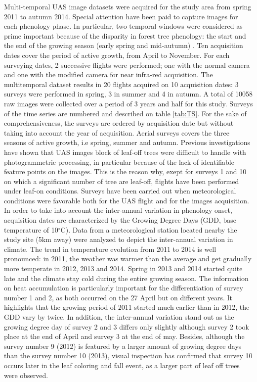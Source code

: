 \documentclass[remotesensing,article,submit,moreauthors,pdftex,12pt,a4paper]{mdpi} %
\begin{document}
Multi-temporal UAS image datasets were acquired for the study area from spring 2011 to autumn 2014. 
Special attention have been paid to capture images for each phenology phase. 
In particular, two temporal windows were considered as prime important because of the disparity in forest tree phenology: the start and the end of the growing season (early spring and mid-autumn) \cite{hill_mapping_2010, key_comparison_2001}. 
Ten acquisition dates cover the period of active growth, from April to November. 
For each surveying dates, 2 successive flights were performed; one with the normal camera and one with the modified camera for near infra-red acquisition. The multitemporal dataset results in 20 flights acquired on 10 acquisition dates: 3 surveys were performed in spring, 3 in summer and 4 in autumn. 
A total of 10058 raw images were collected over a period of 3 years and half for this study. 
Surveys of the time series are numbered and described on table \ref{tab:TS}.
For the sake of comprehensiveness, the surveys are ordered by acquisition date but without taking into account the year of acquisition. 
Aerial surveys covers the three seasons of active growth, i.e spring, summer and autumn. Previous investigations have shown that UAS images block of leaf-off trees were difficult to handle with photogrammetric processing, in particular because of the lack of identifiable feature points on the images. 
This is the reason why, exept for surveys 1 and 10 on which a significant number of tree are leaf-off, flights have been performed under leaf-on conditions. 
Surveys have been carried out when meteorological conditions were favorable both for the UAS flight and for the images acquisition. %
In order to take into account the inter-annual variation in phenology onset, acquisition dates are characterized by the Growing Degree Days (GDD, base temperature of 10$^{\circ}$C). 
Data from a meteorological station located nearby the study site (5km away) were analyzed to depict the inter-annual variation in climate. 
The trend in temperature evolution from 2011 to 2014 is well pronounced: in 2011, the weather was warmer than the average and get gradually more temperate in 2012, 2013 and 2014. Spring in 2013 and 2014 started quite late and the climate stay cold during the entire growing season. 
The information on heat accumulation is particularly important for the differentiation of survey number 1 and 2, as both occurred on the 27 April but on different years. 
It highlights that the growing period of 2011 started much earlier than in 2012, the GDD vary by twice. 
In addition, the inter-annual variation stand out as the growing degree day of survey 2 and 3 differs only slightly although survey 2 took place at the end of April and survey 3 at the end of may. 
Besides, although the survey number 9 (2012) is featured by a larger amount of growing degree days than the survey number 10 (2013), visual inspection has confirmed that survey 10 occurs later in the leaf coloring and fall event, as a larger part of leaf off trees were observed.
\end{document}
